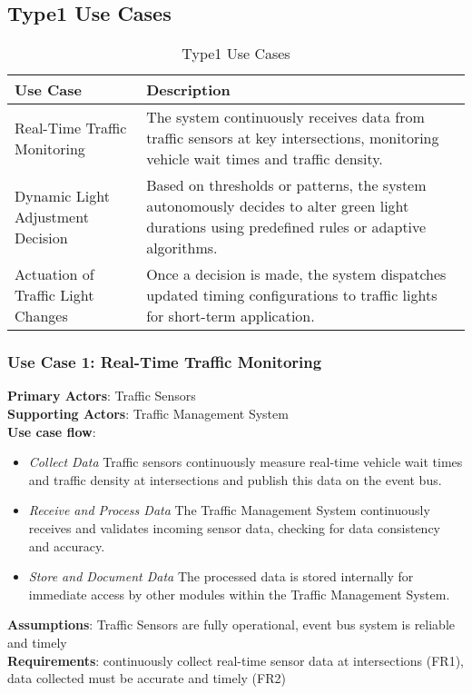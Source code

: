 \documentclass[a4paper,12pt]{article}
\begin{document}
\subsection*{Type1 Use Cases}
\begin{table}[h!]
\centering
\begin{tabular}{|p{4.5cm}|p{8.5cm}|}
\hline
\textbf{Use Case} & \textbf{Description} \\
\hline
Real-Time Traffic Monitoring & The system continuously receives data from traffic sensors at key intersections, monitoring vehicle wait times and traffic density. \\
\hline
Dynamic Light Adjustment Decision & Based on thresholds or patterns, the system autonomously decides to alter green light durations using predefined rules or adaptive algorithms. \\
\hline
Actuation of Traffic Light Changes & Once a decision is made, the system dispatches updated timing configurations to traffic lights for short-term application. \\
\hline
\end{tabular}
\caption{Type1 Use Cases}
\end{table}

\subsubsection*{Use Case 1: Real-Time Traffic Monitoring}
\textbf{Primary Actors}: Traffic Sensors \\
\textbf{Supporting Actors}: Traffic Management System \\
\textbf{Use case flow}: 
\begin{itemize}
    \item \textit{Collect Data} Traffic sensors continuously measure real-time vehicle wait times and traffic density at intersections and publish this data on the event bus.
    \item \textit{Receive and Process Data} The Traffic Management System continuously receives and validates incoming sensor data, checking for data consistency and accuracy.
    \item \textit{Store and Document Data} The processed data is stored internally for immediate access by other modules within the Traffic Management System.
\end{itemize}
\textbf{Assumptions}: Traffic Sensors are fully operational, event bus system is reliable and timely \\
\textbf{Requirements}: continuously collect real-time sensor  data at intersections (FR1), data collected must be accurate and timely (FR2) \\
\end{document}
